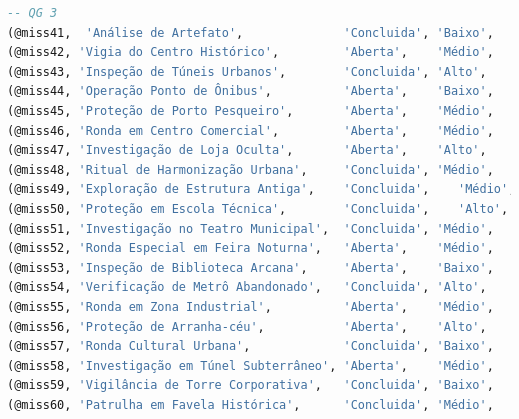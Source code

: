 \documentclass[12pt,a4paper]{report}
\begin{document}
\begin{lstlisting}[language=SQL, caption=population.sql]
-- QG 3
(@miss41,  'Análise de Artefato',              'Concluida', 'Baixo',  'Estudar relíquia',               '2025-02-28 08:00:00', '2025-03-13', @addr9,  @hq3),
(@miss42, 'Vigia do Centro Histórico',         'Aberta',    'Médio',  'Patrulha noturna',               '2025-05-14 22:00:00', NULL,         @addr29, @hq3),
(@miss43, 'Inspeção de Túneis Urbanos',        'Concluida', 'Alto',   'Avaliar riscos de colapso',      '2025-03-12 11:30:00', '2025-03-23', @addr30, @hq3),
(@miss44, 'Operação Ponto de Ônibus',          'Aberta',    'Baixo',  'Monitorar aparições rápidas',    '2025-04-28 17:00:00', NULL,         @addr31, @hq3),
(@miss45, 'Proteção de Porto Pesqueiro',       'Aberta',    'Médio',  'Patrulhar docas',                '2025-05-03 06:30:00', NULL,         @addr36, @hq3),
(@miss46, 'Ronda em Centro Comercial',         'Aberta',    'Médio',  'Observar distúrbios sutis',         '2025-05-21 14:00:00', NULL,         @addr60, @hq3),
(@miss47, 'Investigação de Loja Oculta',       'Aberta',    'Alto',   'Examinar fundo mágico',             '2025-05-22 10:00:00', NULL,         @addr61, @hq3),
(@miss48, 'Ritual de Harmonização Urbana',     'Concluida', 'Médio',  'Equalizar energias da região',      '2025-04-01 18:00:00', '2025-04-21', @addr62, @hq3),
(@miss49, 'Exploração de Estrutura Antiga',    'Concluida',    'Médio',  'Mapear traços arcanos',          '2025-01-24 16:00:00', '2025-02-12',         @addr63, @hq3),
(@miss50, 'Proteção em Escola Técnica',        'Concluida',    'Alto',   'Neutralizar influência nefasta', '2025-02-26 08:00:00', '2025-03-24',         @addr64, @hq3),
(@miss51, 'Investigação no Teatro Municipal',  'Concluida', 'Médio',  'Registrar presenças não-humanas',   '2025-03-01 20:00:00', '2025-04-02', @addr65, @hq3),
(@miss52, 'Ronda Especial em Feira Noturna',   'Aberta',    'Médio',  'Prevenir ocorrências espontâneas',  '2025-05-28 19:00:00', NULL,         @addr66, @hq3),
(@miss53, 'Inspeção de Biblioteca Arcana',     'Aberta',    'Baixo',  'Verificar tomos selados',           '2025-05-29 15:00:00', NULL,         @addr67, @hq3),
(@miss54, 'Verificação de Metrô Abandonado',   'Concluida', 'Alto',   'Identificar criaturas subterrâneas','2025-03-13 22:00:00', '2025-04-04', @addr68, @hq3),
(@miss55, 'Ronda em Zona Industrial',          'Aberta',    'Médio',  'Examinar dispositivos',             '2025-06-01 17:00:00', NULL,         @addr69, @hq3),
(@miss56, 'Proteção de Arranha-céu',           'Aberta',    'Alto',   'Evitar invasões espectrais',     '2025-05-12 23:00:00', NULL,         @addr15, @hq3),
(@miss57, 'Ronda Cultural Urbana',             'Concluida', 'Baixo',  'Inspeção em teatros antigos',    '2025-02-28 18:00:00', '2025-03-18', @addr16, @hq3),
(@miss58, 'Investigação em Túnel Subterrâneo', 'Aberta',    'Médio',  'Averiguar ruídos estranhos',     '2025-05-18 22:30:00', NULL,         @addr17, @hq3),
(@miss59, 'Vigilância de Torre Corporativa',   'Concluida', 'Baixo',  'Checar alarmes místicos',        '2025-03-10 20:00:00', '2025-03-30', @addr19, @hq3),
(@miss60, 'Patrulha em Favela Histórica',      'Concluida', 'Médio',  'Coletar relatos locais',         '2025-02-18 20:00:00', '2025-02-27', @addr32, @hq3),


\end{lstlisting}
\end{document}
